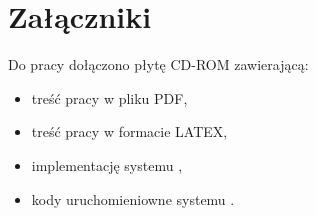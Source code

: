 \newpage\section{Załączniki}
Do pracy dołączono płytę CD-ROM zawierającą:
\begin{itemize}
	\item treść pracy w pliku PDF,
	\item treść pracy w formacie LATEX,
	\item implementację systemu \NazwaSys,
	\item kody uruchomieniowne systemu \NazwaSys. 
\end{itemize} 
